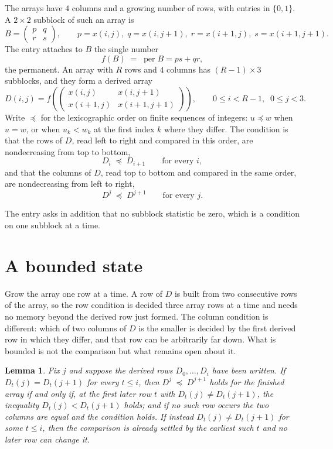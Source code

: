 \documentclass[11pt,a4paper]{article}
\theoremstyle{plain}
\newtheorem{lemma}[theorem]{Lemma}
\theoremstyle{definition}
\begin{document}
The arrays have $4$ columns and a growing number of rows, with entries in $\{0,1\}$. A
$2\times2$ subblock of such an array is
\[
B=\begin{pmatrix} p & q \\ r & s \end{pmatrix},
\qquad p=x(i,j),\; q=x(i,j+1),\; r=x(i+1,j),\; s=x(i+1,j+1).
\]
The entry attaches to $B$ the single number
\[
f(B)\;=\;\operatorname{per}B=ps+qr,
\]
the permanent. An array with $R$ rows and $4$ columns has $(R-1)\times3$ subblocks, and they
form a derived array
\[
D(i,j)=f\!\left(\begin{pmatrix} x(i,j) & x(i,j+1) \\ x(i+1,j) & x(i+1,j+1)\end{pmatrix}
\right),\qquad 0\le i<R-1,\;\; 0\le j<3 .
\]
Write $\preceq$ for the lexicographic order on finite sequences of integers: $u\preceq w$ when
$u=w$, or when $u_k<w_k$ at the first index $k$ where they differ. The condition is that the
rows of $D$, read left to right and compared in this order, are nondecreasing from top to bottom,
\[
D_{i}\;\preceq\;D_{i+1}\qquad\text{for every } i,
\]
and that the columns of $D$, read top to bottom and compared in the same order, are nondecreasing
from left to right,
\[
D^{j}\;\preceq\;D^{j+1}\qquad\text{for every } j .
\]

The entry asks in addition that no subblock statistic be zero, which is a condition on one subblock at a time.


\section{A bounded state}

Grow the array one row at a time. A row of $D$ is built from two consecutive rows of the array,
so the row condition is decided three array rows at a time and needs no memory beyond the
derived row just formed. The column condition is different: which of two columns of $D$ is the
smaller is decided by the first derived row in which they differ, and that row can be
arbitrarily far down. What is bounded is not the comparison but what remains open about it.

\begin{lemma}\label{lem:bits}
Fix $j$ and suppose the derived rows $D_0,\dots,D_i$ have been written. If $D_t(j)=D_t(j+1)$ for
every $t\le i$, then $D^{j}\;\preceq\;D^{j+1}$ holds for the finished array if and only if,
at the first later row $t$ with $D_t(j)\neq D_t(j+1)$, the inequality $D_t(j)<D_t(j+1)$
holds; and if no such row occurs the two columns are equal and the condition holds. If instead
$D_t(j)\neq D_t(j+1)$ for some $t\le i$, then the comparison is already settled by the earliest
such $t$ and no later row can change it.
\end{lemma}
\end{document}
